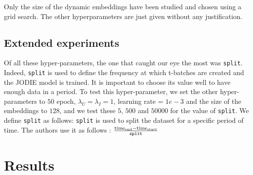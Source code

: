 Only the size of the dynamic embeddings have been studied and chosen using a grid search. The other hyperparameters are just given without any justification.

\subsection*{Extended experiments}


Of all these hyper-parameters, the one that caught our eye the most was \texttt{split}. Indeed, \texttt{split} is used to define the frequency at which t-batches are created and the JODIE model is trained. It is important to choose its value well to have enough data in a period. To test this hyper-parameter, we set the other hyper-parameters to $50$ epoch, $\lambda_U = \lambda_I = 1$, learning rate = $1e-3$ and the size of the embeddings to $128$, and we test these $5$, $500$ and $50000$ for the value of \texttt{split}. We define \texttt{split} as follows:
\texttt{split} is used to split the dataset for a specific period of time. The authors use it as follows : $\frac{\text{time}_{\text{end}} - \text{time}_{\text{start}}}{\text{\texttt{split}}}$

\section*{Results}

